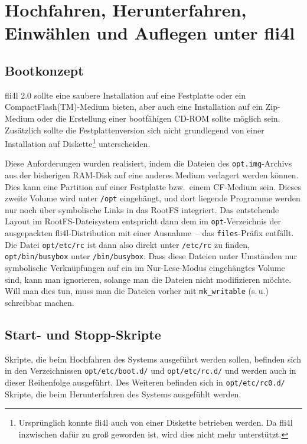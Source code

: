
\section{Hochfahren, Herunterfahren, Einwählen und Auflegen unter fli4l}

\subsection{Bootkonzept}

fli4l 2.0 sollte eine saubere Installation auf eine Festplatte oder ein
CompactFlash(TM)-Medium bieten, aber auch eine Installation auf ein
Zip-Medium oder die Erstellung einer bootfähigen CD-ROM sollte möglich
sein. Zusätzlich sollte die Festplattenversion sich nicht grundlegend von
einer Installation auf Diskette\footnote{Ursprünglich konnte fli4l auch
von einer Diskette betrieben werden. Da fli4l inzwischen dafür zu groß geworden
ist, wird dies nicht mehr unterstützt.} unterscheiden.

Diese Anforderungen wurden realisiert, indem die Dateien des
\texttt{opt.img}-Archivs aus der
bisherigen RAM-Disk auf eine anderes Medium verlagert werden können. Dies
kann eine Partition auf einer Festplatte bzw.\ einem CF-Medium sein. Dieses
zweite Volume wird unter \texttt{/opt} eingehängt, und dort liegende Programme
werden nur noch über symbolische Links in das RootFS integriert. Das entstehende Layout im
RootFS-Dateisystem entspricht dann dem im \texttt{opt}-Verzeichnis der
ausgepackten fli4l-Distribution mit einer Ausnahme~-- das \texttt{files}-Präfix
entfällt. Die Datei \texttt{opt/etc/rc} ist dann also direkt unter \texttt{/etc/rc} zu
finden, \texttt{opt/bin/busybox} unter
\texttt{/bin/busybox}. Dass diese Dateien unter Umständen nur symbolische Verknüpfungen
auf ein im Nur-Lese-Modus eingehängtes Volume sind, kann man ignorieren,
solange man die Dateien nicht modifizieren möchte. Will man dies tun,
muss man die Dateien vorher mit \texttt{mk\_writable} (s.\,u.) schreibbar machen.

\subsection{Start- und Stopp-Skripte}

Skripte, die beim Hochfahren des Systems ausgeführt werden sollen, befinden
sich in den Verzeichnissen \texttt{opt/etc/boot.d/} und \texttt{opt/etc/rc.d/}
und werden auch in dieser Reihenfolge ausgeführt. Des Weiteren befinden sich in
\texttt{opt/etc/rc0.d/} Skripte, die beim Herunterfahren des Systems ausgefühlt
werden.

